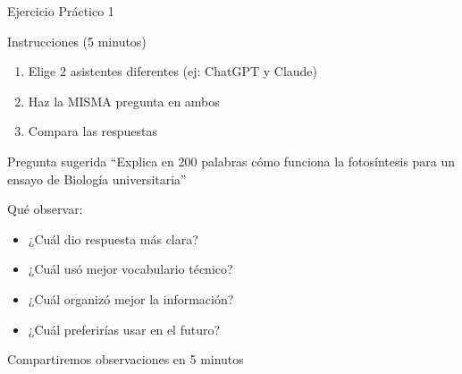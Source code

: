 \documentclass[aspectratio=169,xcolor={dvipsnames}]{beamer}
\begin{document}
	
	
	\begin{frame}{Ejercicio Práctico 1}
		
		\begin{alertblock}{Instrucciones (5 minutos)}
			\begin{enumerate}
				\item Elige 2 asistentes diferentes (ej: ChatGPT y Claude)
				\item Haz la MISMA pregunta en ambos
				\item Compara las respuestas
			\end{enumerate}
		\end{alertblock}
		
		\vspace{0.3cm}
		
		\begin{exampleblock}{Pregunta sugerida}
			``Explica en 200 palabras cómo funciona la fotosíntesis para un ensayo de Biología universitaria''
		\end{exampleblock}
		
		\vspace{0.5cm}
		
		\begin{block}{Qué observar:}
			\begin{itemize}
				\item ¿Cuál dio respuesta más clara?
				\item ¿Cuál usó mejor vocabulario técnico?
				\item ¿Cuál organizó mejor la información?
				\item ¿Cuál preferirías usar en el futuro?
			\end{itemize}
		\end{block}
		
		\vspace{0.3cm}
		\centering
		{\large Compartiremos observaciones en 5 minutos}
		
	\end{frame}
	
	
\end{document}
